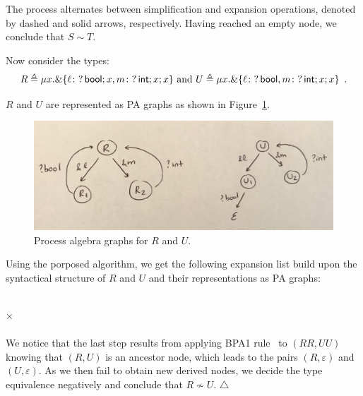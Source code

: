 \begin{example}
	The process alternates between simplification and expansion operations, denoted by dashed and solid arrows, respectively. Having reached an empty node, we conclude that $S\sim T$.\\\smallskip
	
	Now consider the types:
	\[ R \triangleq \mu x.\&\{\ell\colon ?\,\mathsf{bool};x, m\colon ?\,\mathsf{int};x;x \} \text{ and }  U \triangleq \mu x.\&\{\ell\colon ?\,\mathsf{bool}, m\colon ?\,\mathsf{int};x;x\} \enspace .\]
	
	$R$ and $U$ are represented as PA graphs as shown in Figure~\ref{fig:PAgraphsRU}.
	
	\begin{figure}[h!]
	\centering
		\includegraphics[width=14cm]{PAgraphsRU.jpg}
		\caption{Process algebra graphs for $R$ and $U$.}
		\label{fig:PAgraphsRU}
	\end{figure}
	Using the porposed algorithm, we get the following expansion list build upon the syntactical structure of $R$ and $U$ and their representations as PA graphs:\\\\
\enspace  $\times$\\\\
We notice that the last step results from applying BPA1 rule~\cite{janvcar1999techniques} to $(RR,UU)$ knowing that $(R,U)$ is an ancestor node, which leads to the pairs $(R,\varepsilon)$ and $(U,\varepsilon)$. As we then fail to obtain new derived nodes, we decide the type equivalence negatively and conclude that $R\not\sim U$.
	\hfill $\triangle$
\end{example}
